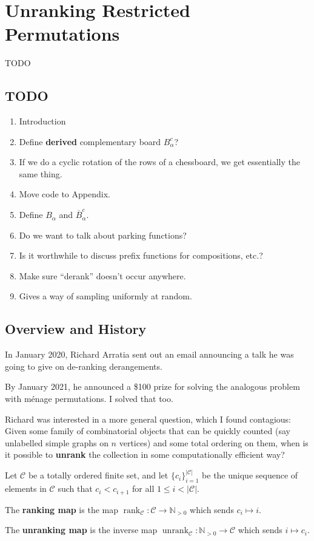 \chapter{Unranking Restricted Permutations}
\label{cha:UnrankingMenage}
TODO

\section{TODO}
\begin{enumerate}
  \item Introduction
  \item Define \textbf{derived} complementary board $B_\alpha^c$?
  \item If we do a cyclic rotation of the rows of a chessboard, we get
    essentially the same thing.
  \item Move code to Appendix.
  \item Define $B_\alpha$ and $\overline{B}_\alpha^c$.
  \item Do we want to talk about parking functions?
  \item Is it worthwhile to discuss prefix functions for compositions, etc.?
  \item Make sure ``derank'' doesn't occur anywhere.
  \item Gives a way of sampling uniformly at random.
\end{enumerate}

\section{Overview and History}

In January 2020, Richard Arratia sent out an email announcing a talk he was
going to give on de-ranking derangements.

By January 2021, he announced a \$100 prize for solving the analogous problem
with m\'enage permutations. I solved that too.

Richard was interested in a more general question, which I found contagious:
Given some family of combinatorial objects that can be quickly counted
(say unlabelled simple graphs on $n$ vertices)
and some total ordering on them,
when is it possible to \textbf{unrank} the collection in some computationally
efficient way?

\begin{definition}
  Let $\mathcal C$ be a totally ordered finite set, and
  let $\{c_i\}_{i=1}^{|\mathcal C|}$ be the unique sequence of elements in
  $\mathcal{C}$ such that $c_i < c_{i+1}$ for all $1 \leq i < |\mathcal{C}|$.

  The \textbf{ranking map} is the map
  $\operatorname{rank}_{\mathcal{C}} \colon \mathcal{C} \rightarrow \mathbb N_{>0}$
  which sends $c_i \mapsto i$.

  The \textbf{unranking map} is the inverse map
  $\operatorname{unrank}_{\mathcal{C}} \colon \mathbb N_{>0} \rightarrow \mathcal{C}$
  which sends $i \mapsto c_i$.
\end{definition}

